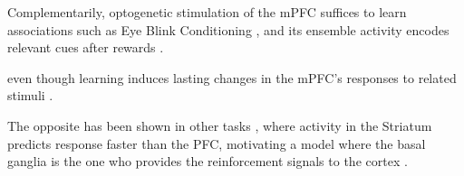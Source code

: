 Complementarily, optogenetic stimulation of the mPFC suffices to learn associations such as Eye Blink Conditioning \cite{wu2015optogenetic}, and its ensemble activity encodes relevant cues after rewards \cite{maggi2018ensemble}. 
    
even though learning induces lasting changes in the mPFC's responses to related stimuli \cite{takehara2008spontaneous}.
    
The opposite has been shown in other tasks \cite{pasupathy2005different}, where activity in the Striatum predicts response faster than the PFC, motivating a model where the basal ganglia is the one who provides the reinforcement signals to the cortex \cite{helie2015learning}. 
    